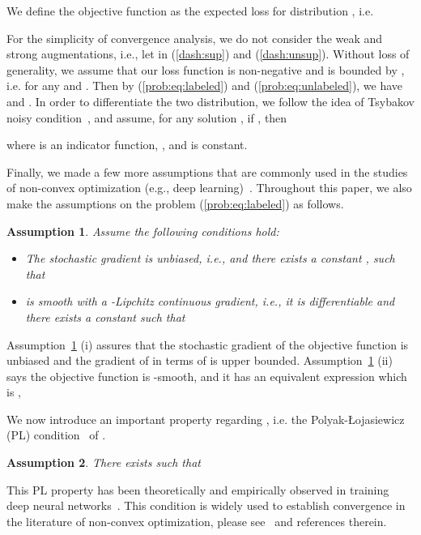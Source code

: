 \documentclass{article}
\newtheorem{ass}{Assumption}
\begin{document}
We define the objective function  as the expected loss for distribution , i.e.


For the simplicity of convergence analysis, we do not consider the weak and strong augmentations, i.e., let  in (\ref{dash:sup}) and (\ref{dash:unsup}). Without loss of generality, we assume that our loss function is non-negative and is bounded by , i.e.  for any  and . Then by (\ref{prob:eq:labeled}) and (\ref{prob:eq:unlabeled}), we have  and . In order to differentiate the two distribution, we follow the idea of Tsybakov noisy condition~\citep{mammen1999smooth,tsybakov2004optimal}, and assume, for any solution , if , then

where  is an indicator function, , and  is constant.

Finally, we made a few more assumptions that are commonly used in the studies of non-convex optimization (e.g., deep learning)~\citep{ghadimi2013stochastic,yuan2019stagewise}. Throughout this paper, we also make the assumptions on the problem (\ref{prob:eq:labeled}) as follows.
\begin{ass}\label{ass:2}
Assume the following conditions hold: 
\begin{itemize} 
\item[(i)]  The stochastic gradient  is unbiased, i.e.,  and there exists a constant , such that  
\item[(ii)]  is smooth with a -Lipchitz continuous gradient, i.e., it is differentiable and there exists a constant  such that 
\end{itemize}
\end{ass}
Assumption~\ref{ass:2} (i) assures that the stochastic gradient of the objective function is unbiased and the gradient of  in terms of  is upper bounded. Assumption~\ref{ass:2} (ii) says the objective function is -smooth, and it has an equivalent expression which is , 
   

We now introduce an important property regarding , i.e. the Polyak-{\L}ojasiewicz (PL) condition~\citep{polyak1963gradient} of . 
\begin{ass}\label{ass:3}
There exists  such that 
\end{ass}
This PL property has been theoretically and empirically observed in training deep neural networks~\citep{allen2019convergence, yuan2019stagewise}. This condition is widely used to establish convergence in the literature of non-convex optimization, please see~\citep{yuan2019stagewise, wang2019spiderboost, karimi2016linear, li2018simple, charles2018stability} and references therein.  
\end{document}
